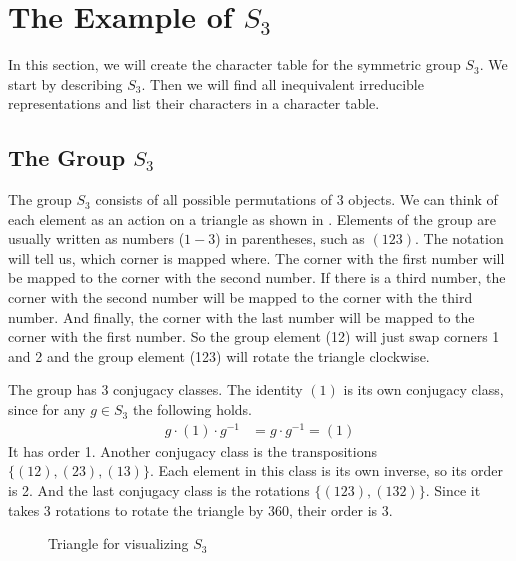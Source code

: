 \section{The Example of $S_3$}

In this section, we will create the character table for the symmetric group $S_3$.
We start by describing $S_3$.
Then we will find all inequivalent irreducible representations and list their characters in a character table.

\subsection{The Group $S_3$}
\label{sec:ex.group}

The group $S_3$ consists of all possible permutations of $3$ objects.
We can think of each element as an action on a triangle as shown in .
Elements of the group are usually written as numbers ($1-3$) in parentheses, such as $(123)$.
The notation will tell us, which corner is mapped where.
The corner with the first number will be mapped to the corner with the second number.
If there is a third number, the corner with the second number will be mapped to the corner with the third number.
And finally, the corner with the last number will be mapped to the corner with the first number.
So the group element (12) will just swap corners 1 and 2 and the group element (123) will rotate the triangle clockwise.

The group has 3 conjugacy classes.
The identity $(1)$ is its own conjugacy class, since for any $g \in S_3$ the following holds.
\begin{align}
    g \cdot (1) \cdot g^{-1} & = g \cdot g^{-1} = (1)
\end{align}
It has order 1.
Another conjugacy class is the transpositions $\{(12), (23), (13)\}$. 
Each element in this class is its own inverse, so its order is 2.
And the last conjugacy class is the rotations $\{(123), (132)\}$.
Since it takes 3 rotations to rotate the triangle by 360\textdegree, their order is 3.

\begin{figure}[!h]
    \centering
    

    \caption{Triangle for visualizing $S_3$}
    \label{fig:reprep.char.triangle}
\end{figure}

